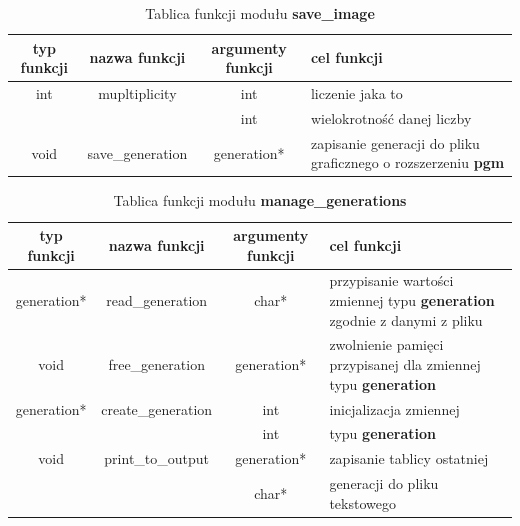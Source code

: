 \documentclass[a4paper]{article}
\begin{document}
\newpage

\begin{table}[h!]
	\centering

	\caption{\label{table:Tabela3} Tablica funkcji modu\l{}u \textbf{save\_image}}
        
	\begin{tabular}{| c | c | c | p{3cm}  |}
                \hline
                typ funkcji & nazwa funkcji & argumenty funkcji & cel funkcji \\ \hline \hline

                int & mupltiplicity & int & liczenie jaka to \\
                & & int & wielokrotno\'s\'c danej liczby\\ \hline

                void & save\_generation & generation* & zapisanie generacji do pliku graficznego o rozszerzeniu \textbf{pgm} \\ \hline

        \end{tabular}
\end{table}




\begin{table}[h!]
	\centering
	\caption{\label{table:Tabela4}Tablica funkcji modu\l{}u \textbf{manage\_generations}}
        \begin{tabular}{| c | c | c | p{3cm}  |}
                \hline
                typ funkcji & nazwa funkcji & argumenty funkcji & cel funkcji \\ \hline \hline

                generation* & read\_generation & char* & przypisanie warto\'sci zmiennej typu \textbf{generation} zgodnie z danymi z pliku     \\ \hline
                void & free\_generation & generation* & zwolnienie pami\k{e}ci przypisanej dla zmiennej typu \textbf{generation} \\ \hline
                generation* & create\_generation & int & inicjalizacja zmiennej \\
                & & int & typu \textbf{generation}\\ \hline

                void & print\_to\_output & generation* & zapisanie tablicy ostatniej \\
                & & char* & generacji do pliku tekstowego\\ \hline

        \end{tabular}
\end{table}
\end{document}
